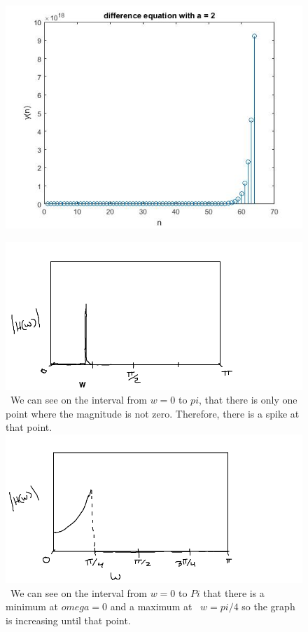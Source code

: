 \documentclass{article}
\begin{document}
\begin{figure}[H]

\includegraphics[scale = .5]{report3}

\end{figure}

\begin{figure}[H]
\includegraphics[scale = .5]{report4_1}
\ We can see on the interval from $w = 0$ to $pi$, that there is only one point where the magnitude is not zero. Therefore, there is a spike at that point.
\includegraphics[scale = .5]{report4_2}
\ We can see on the interval from $w = 0$ to $Pi$ that there is a minimum at $omega = 0$ and a maximum at ~$w = pi/4$ so the graph is increasing until that point.
\end{figure}
\end{document}
